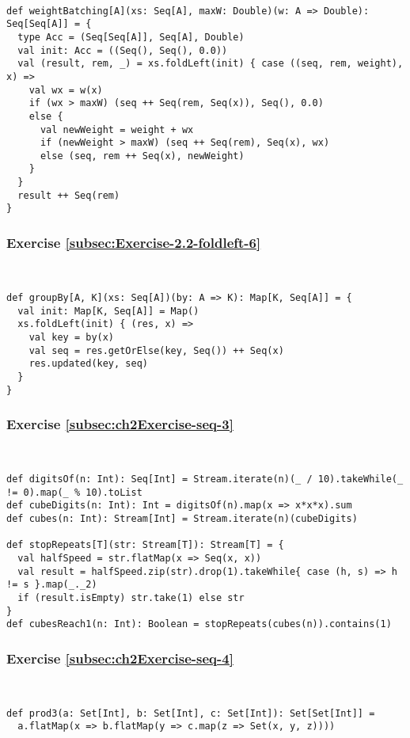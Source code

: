 ~
\begin{lstlisting}
def weightBatching[A](xs: Seq[A], maxW: Double)(w: A => Double): Seq[Seq[A]] = {  
  type Acc = (Seq[Seq[A]], Seq[A], Double)
  val init: Acc = ((Seq(), Seq(), 0.0))
  val (result, rem, _) = xs.foldLeft(init) { case ((seq, rem, weight), x) =>
    val wx = w(x)
    if (wx > maxW) (seq ++ Seq(rem, Seq(x)), Seq(), 0.0)
    else {
      val newWeight = weight + wx
      if (newWeight > maxW) (seq ++ Seq(rem), Seq(x), wx)
      else (seq, rem ++ Seq(x), newWeight)
    }
  }
  result ++ Seq(rem)
}
\end{lstlisting}


\subsubsection*{Exercise \ref{subsec:Exercise-2.2-foldleft-6}}

~
\begin{lstlisting}
def groupBy[A, K](xs: Seq[A])(by: A => K): Map[K, Seq[A]] = {  
  val init: Map[K, Seq[A]] = Map()
  xs.foldLeft(init) { (res, x) =>
    val key = by(x)
    val seq = res.getOrElse(key, Seq()) ++ Seq(x)
    res.updated(key, seq)
  }
}
\end{lstlisting}


\subsubsection*{Exercise \ref{subsec:ch2Exercise-seq-3}}

~
\begin{lstlisting}
def digitsOf(n: Int): Seq[Int] = Stream.iterate(n)(_ / 10).takeWhile(_ != 0).map(_ % 10).toList
def cubeDigits(n: Int): Int = digitsOf(n).map(x => x*x*x).sum
def cubes(n: Int): Stream[Int] = Stream.iterate(n)(cubeDigits)

def stopRepeats[T](str: Stream[T]): Stream[T] = {
  val halfSpeed = str.flatMap(x => Seq(x, x))
  val result = halfSpeed.zip(str).drop(1).takeWhile{ case (h, s) => h != s }.map(_._2)
  if (result.isEmpty) str.take(1) else str
}
def cubesReach1(n: Int): Boolean = stopRepeats(cubes(n)).contains(1)
\end{lstlisting}


\subsubsection*{Exercise \ref{subsec:ch2Exercise-seq-4}}

~
\begin{lstlisting}
def prod3(a: Set[Int], b: Set[Int], c: Set[Int]): Set[Set[Int]] =
  a.flatMap(x => b.flatMap(y => c.map(z => Set(x, y, z))))
\end{lstlisting}


